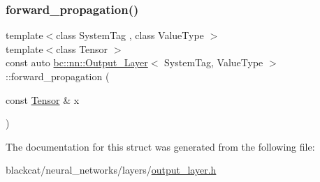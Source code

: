 \mbox{\label{structbc_1_1nn_1_1Output__Layer_ab55ef92dd44d2319b84776a9edf9da9a}} 
\subsubsection{\texorpdfstring{forward\+\_\+propagation()}{forward\_propagation()}}
{\footnotesize\ttfamily template$<$class System\+Tag , class Value\+Type $>$ \\
template$<$class Tensor $>$ \\
const auto \hyperlink{structbc_1_1nn_1_1Output__Layer}{bc\+::nn\+::\+Output\+\_\+\+Layer}$<$ System\+Tag, Value\+Type $>$\+::forward\+\_\+propagation (\begin{DoxyParamCaption}\item[{const \hyperlink{namespacebc_a659391e47ab612be3ba6c18cf9c89159}{Tensor} \&}]{x }\end{DoxyParamCaption})\hspace{0.3cm}{\ttfamily [inline]}}



The documentation for this struct was generated from the following file\+:\begin{DoxyCompactItemize}
\item 
blackcat/neural\+\_\+networks/layers/\hyperlink{output__layer_8h}{output\+\_\+layer.\+h}\end{DoxyCompactItemize}
